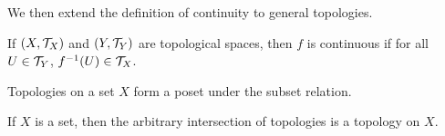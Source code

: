 We then extend the definition of continuity to general topologies.
\begin{definition}[Continuity]
    If $(X, \mathcal T_X)$ and $(Y, \mathcal T_Y)$ are topological spaces, then $f$ is continuous if for all $U \in \mathcal T_Y$, $f^{-1}(U) \in \mathcal T_X$.
\end{definition}

Topologies on a set $X$ form a poset under the subset relation.

\begin{proposition}
    If $X$ is a set, then the arbitrary intersection of topologies is a topology on $X$.
\end{proposition}
